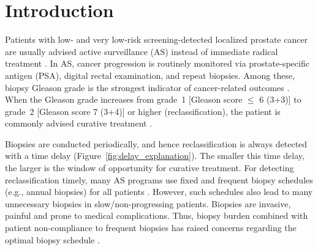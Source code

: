 \section{Introduction}
Patients with low- and very low-risk screening-detected localized prostate cancer are usually advised active surveillance (AS) instead of immediate radical treatment \citep{briganti2018active}. In AS, cancer progression is routinely monitored via prostate-specific antigen (PSA), digital rectal examination, and repeat biopsies. Among these, biopsy Gleason grade is the strongest indicator of cancer-related outcomes \citep{epsteinGG2014}. When the Gleason grade increases from grade~1 [Gleason score $\leq$ 6 (3+3)] to grade~2 [Gleason score 7 (3+4)] or higher (reclassification), the patient is commonly advised curative treatment \citep{bul2013active}.

Biopsies are conducted periodically, and hence reclassification is always detected with a time delay (Figure~\ref{fig:delay_explanation}). The smaller this time delay, the larger is the window of opportunity for curative treatment. For detecting reclassification timely, many AS programs use fixed and frequent biopsy schedules (e.g., annual biopsies) for all patients \citep{nieboer2018active,loeb2014heterogeneity}. However, such schedules also lead to many unnecessary biopsies in slow/non-progressing patients. Biopsies are invasive, painful and prone to medical complications. Thus, biopsy burden combined with patient non-compliance to frequent biopsies \citep{bokhorst2015compliance} has raised concerns regarding the optimal biopsy schedule \citep{inoue2018comparative, bratt2013study}.

